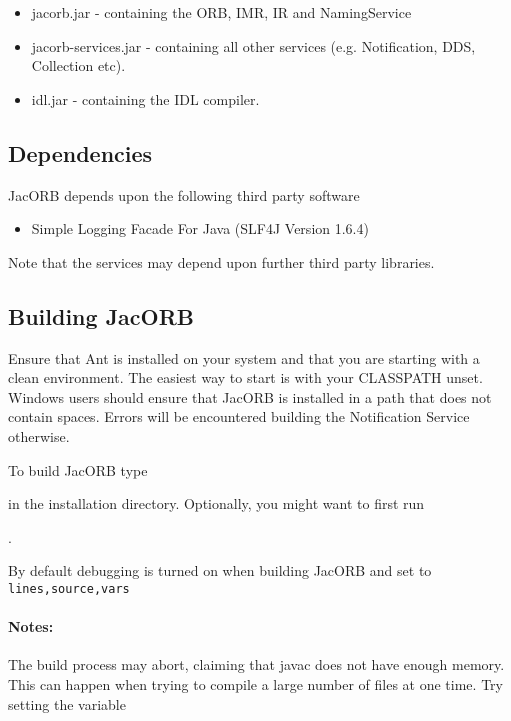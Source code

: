 \begin{itemize}
\item jacorb.jar          - containing the ORB, IMR, IR and NamingService
\item jacorb-services.jar - containing all other services (e.g. Notification, DDS, Collection etc).
\item idl.jar             - containing the IDL compiler.
\end{itemize}

\subsection{Dependencies}

JacORB depends upon the following third party software
\begin{itemize}
\item Simple Logging Facade For Java (SLF4J Version 1.6.4)
\end{itemize}

Note that the services may depend upon further third party libraries.

\subsection{Building JacORB}
\label{sec:building}

Ensure that Ant is installed on your system and that you are starting with a
clean environment. The easiest way to start is with your CLASSPATH
unset. Windows users should ensure that JacORB is installed in a path that does
not contain spaces. Errors will be encountered building the Notification Service
otherwise.

To build JacORB type


in the installation directory. Optionally, you might want to first run

.

By default debugging is turned on when building JacORB and set to {\tt lines,source,vars}
\paragraph{Notes:}
The build process may abort, claiming that javac does not have enough
memory. This can happen when trying to compile a large number of files at one
time. Try setting the variable



